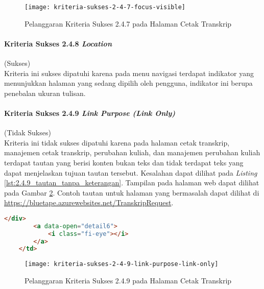 \begin{figure}[H]
    \centering  
    \texttt{[image: kriteria-sukses-2-4-7-focus-visible]}  
    \caption[Pelanggaran Kriteria Sukses 2.4.7 pada Halaman Cetak Transkrip]{Pelanggaran Kriteria Sukses 2.4.7 pada Halaman Cetak Transkrip}
    \label{fig:2.4.7_focus_visible}  
\end{figure}

\paragraph{Kriteria Sukses 2.4.8 \textit{Location}}
\label{par:kepatuhan_bluetape_kriteria_sukses_2.4.8}
(Sukses)\\

Kriteria ini sukses dipatuhi karena pada menu navigasi terdapat indikator yang menunjukkan halaman yang sedang dipilih oleh pengguna, indikator ini berupa penebalan ukuran tulisan.

\paragraph{Kriteria Sukses 2.4.9 \textit{Link Purpose (Link Only)}}
\label{par:kepatuhan_bluetape_kriteria_sukses_2.4.9}
(Tidak Sukses)\\

Kriteria ini tidak sukses dipatuhi karena pada halaman cetak transkrip, manajemen cetak transkrip, perubahan kuliah, dan manajemen perubahan kuliah terdapat tautan yang berisi konten bukan teks dan tidak terdapat teks yang dapat menjelaskan tujuan tautan tersebut. Kesalahan dapat dilihat pada \textit{Listing} \ref{lst:2.4.9_tautan_tanpa_keterangan}. Tampilan pada halaman web dapat dilihat pada Gambar \ref{fig:2.4.9_link_purpose_link_only}. Contoh tautan untuk halaman yang bermasalah dapat dilihat di \url{https://bluetape.azurewebsites.net/TranskripRequest}.

\begin{lstlisting}[frame=single, label={lst:2.4.9_tautan_tanpa_keterangan}, language=HTML, caption=Pelanggaran Kriteria Sukses 2.4.9 pada Halaman Cetak Transkrip]
        </div>
        <a data-open="detail6">
            <i class="fi-eye"></i>
        </a>
    </td>
\end{lstlisting}

\begin{figure}[H]
    \centering  
    \texttt{[image: kriteria-sukses-2-4-9-link-purpose-link-only]}  
    \caption[Pelanggaran Kriteria Sukses 2.4.9 pada Halaman Cetak Transkrip]{Pelanggaran Kriteria Sukses 2.4.9 pada Halaman Cetak Transkrip}
    \label{fig:2.4.9_link_purpose_link_only}  
\end{figure} 

